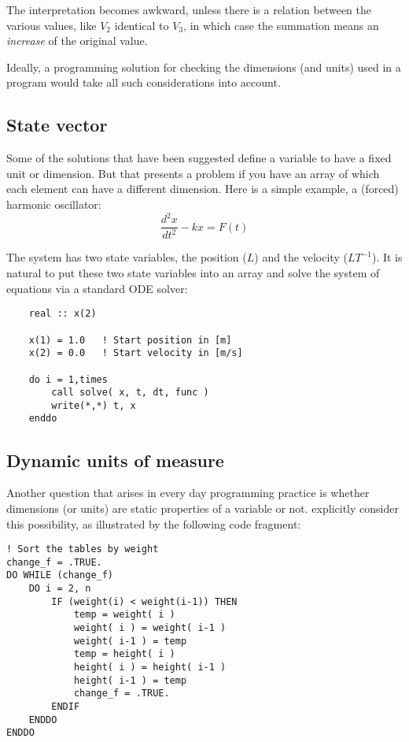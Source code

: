\documentclass{article}
\begin{document}
The interpretation becomes awkward, unless there is a relation between the various values, like $V_2$ identical to $V_3$, in
which case the summation means an \emph{increase} of the original value.

Ideally, a programming solution for checking the dimensions (and units) used in a program would take all such considerations
into account.

\subsection*{State vector}
Some of the solutions that have been suggested define a variable to have a fixed unit or dimension. But that presents
a problem if you have an array of which each element can have a different dimension. Here is a simple example,
a (forced) harmonic oscillator:
\begin{equation}
    \frac{d^2 x}{dt^2} - kx = F(t)
\end{equation}

The system has two state variables, the position ($L$) and the velocity ($L T^{-1}$). It is natural to put these two
state variables into an array and solve the system of equations via a standard ODE solver:
\begin{verbatim}
    real :: x(2)

    x(1) = 1.0   ! Start position in [m]
    x(2) = 0.0   ! Start velocity in [m/s]

    do i = 1,times
        call solve( x, t, dt, func )
        write(*,*) t, x
    enddo
\end{verbatim}

\subsection*{Dynamic units of measure}
Another question that arises in every day programming practice is whether dimensions (or units) are static properties
of a variable or not. \cite{FPTSymbolLives} explicitly consider this possibility, as illustrated by the following
code fragment:

\begin{verbatim}
! Sort the tables by weight
change_f = .TRUE.
DO WHILE (change_f)
    DO i = 2, n
        IF (weight(i) < weight(i-1)) THEN
            temp = weight( i )
            weight( i ) = weight( i-1 )
            weight( i-1 ) = temp
            temp = height( i )
            height( i ) = height( i-1 )
            height( i-1 ) = temp
            change_f = .TRUE.
        ENDIF
    ENDDO
ENDDO
\end{verbatim}
\end{document}
